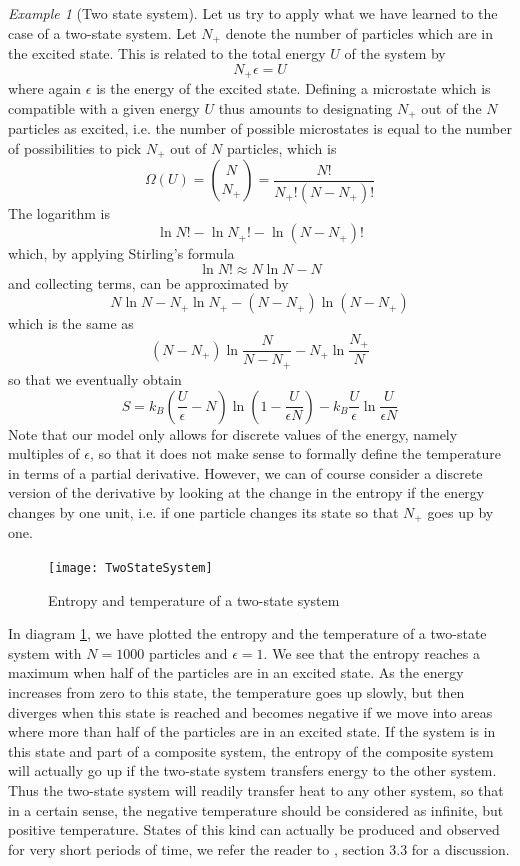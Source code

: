 \documentclass[a4paper, draft]{article}
\theoremstyle{own}
\theoremstyle{remark}
\newtheorem{example}{Example}[section]
\begin{document}
\begin{example}[Two state system]
Let us try to apply what we have learned to the case of a two-state system. Let $N_+$ denote the number of particles which are in the excited state. This is related to the total energy $U$ of the system by
$$
N_+ \epsilon = U
$$
where again $\epsilon$ is the energy of the excited state. Defining a microstate which is compatible with a given energy $U$ thus amounts to designating $N_+$ out of the $N$ particles as excited, i.e. the number of possible microstates is equal to the number of possibilities to pick $N_+$ out of $N$ particles, which is
$$
\Omega(U) = \binom{N}{N_+} 
= \frac{N!}{N_+ ! (N-N_+)!}
$$
The logarithm is
$$
\ln N! - \ln N_+! - \ln (N-N_+)!
$$
which, by applying Stirling's formula 
$$
\ln N! \approx N \ln N - N
$$
and collecting terms, can be approximated by 
$$
N \ln N - N_+ \ln N_+ - (N - N_+) \ln (N - N_+) 
$$
which is the same as
$$
(N - N_+) \ln \frac{N}{N-N_+} - N_+ \ln \frac{N_+}{N}
$$
so that we eventually obtain
$$
S = k_B (\frac{U}{\epsilon} - N) \ln  (1 - \frac{U}{\epsilon N}) 
- k_B \frac{U}{\epsilon} \ln \frac{U}{\epsilon N}
$$
Note that our model only allows for discrete values of the energy, namely multiples of $\epsilon$, so that it does not make sense to formally define the temperature in terms of a partial derivative. However, we can of course consider a discrete version of the derivative by looking at the change in the entropy if the energy changes by one unit, i.e. if one particle changes its state so that $N_+$ goes up by one. 


\begin{figure}[ht]
\centering
\texttt{[image: TwoStateSystem]}
\caption{Entropy and temperature of a two-state system}
\label{fig:TwoStateSystem}
\end{figure}

In diagram 
\ref{fig:TwoStateSystem}, we have plotted the entropy and the temperature of a two-state system with $N=1000$ particles and $\epsilon = 1$. We see that the entropy reaches a maximum when half of the particles are in an excited state. As the energy increases from zero to this state, the temperature goes up slowly, but then diverges when this state is reached and becomes negative if we move into areas where more than half of the particles are in an excited state. If the system is in this state and part of a composite system, the entropy of the composite system will actually go up if the two-state system transfers energy to the other system. Thus the two-state system will readily transfer heat to any other system, so that in a certain sense, the negative temperature should be considered as infinite, but positive temperature. States of this kind can actually be produced and observed for very short periods of time, we refer the reader to \cite{Schroeder}, section 3.3 for a discussion.
\end{example}
\end{document}
